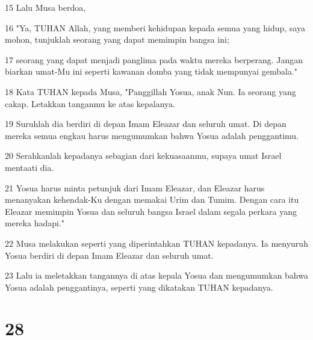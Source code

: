 \par 15 Lalu Musa berdoa,
\par 16 "Ya, TUHAN Allah, yang memberi kehidupan kepada semua yang hidup, saya mohon, tunjuklah seorang yang dapat memimpin bangsa ini;
\par 17 seorang yang dapat menjadi panglima pada waktu mereka berperang. Jangan biarkan umat-Mu ini seperti kawanan domba yang tidak mempunyai gembala."
\par 18 Kata TUHAN kepada Musa, "Panggillah Yosua, anak Nun. Ia seorang yang cakap. Letakkan tanganmu ke atas kepalanya.
\par 19 Suruhlah dia berdiri di depan Imam Eleazar dan seluruh umat. Di depan mereka semua engkau harus mengumumkan bahwa Yosua adalah penggantimu.
\par 20 Serahkanlah kepadanya sebagian dari kekuasaanmu, supaya umat Israel mentaati dia.
\par 21 Yosua harus minta petunjuk dari Imam Eleazar, dan Eleazar harus menanyakan kehendak-Ku dengan memakai Urim dan Tumim. Dengan cara itu Eleazar memimpin Yosua dan seluruh bangsa Israel dalam segala perkara yang mereka hadapi."
\par 22 Musa melakukan seperti yang diperintahkan TUHAN kepadanya. Ia menyuruh Yosua berdiri di depan Imam Eleazar dan seluruh umat.
\par 23 Lalu ia meletakkan tangannya di atas kepala Yosua dan mengumumkan bahwa Yosua adalah penggantinya, seperti yang dikatakan TUHAN kepadanya.

\chapter{28}

